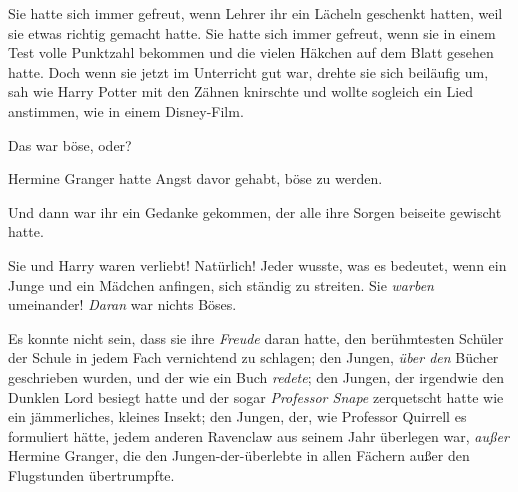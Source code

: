 Sie hatte sich immer gefreut, wenn Lehrer ihr ein Lächeln geschenkt hatten, weil sie etwas richtig gemacht hatte. Sie hatte sich immer gefreut, wenn sie in einem Test volle Punktzahl bekommen und die vielen Häkchen auf dem Blatt gesehen hatte. Doch wenn sie jetzt im Unterricht gut war, drehte sie sich beiläufig um, sah wie Harry Potter mit den Zähnen knirschte und wollte sogleich ein Lied anstimmen, wie in einem Disney-Film.

Das war böse, oder?

Hermine Granger hatte Angst davor gehabt, böse zu werden.

Und dann war ihr ein Gedanke gekommen, der alle ihre Sorgen beiseite gewischt hatte.

Sie und Harry waren verliebt! Natürlich! Jeder wusste, was es bedeutet, wenn ein Junge und ein Mädchen anfingen, sich ständig zu streiten. Sie \emph{warben} umeinander! \emph{Daran} war nichts Böses.

Es konnte nicht sein, dass sie ihre \emph{Freude} daran hatte, den berühmtesten Schüler der Schule in jedem Fach vernichtend zu schlagen; den Jungen, \emph{über den} Bücher geschrieben wurden, und der wie ein Buch \emph{redete}; den Jungen, der irgendwie den Dunklen Lord besiegt hatte und der sogar \emph{Professor Snape} zerquetscht hatte wie ein jämmerliches, kleines Insekt; den Jungen, der, wie Professor Quirrell es formuliert hätte, jedem anderen Ravenclaw aus seinem Jahr überlegen war, \emph{außer} Hermine Granger, die den Jungen-der-überlebte in allen Fächern außer den Flugstunden übertrumpfte.

